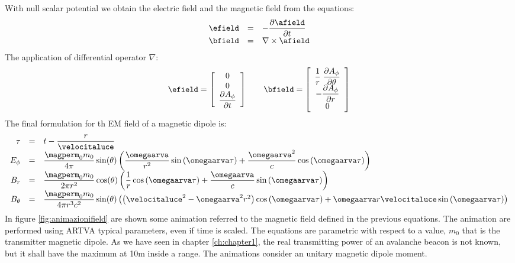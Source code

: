 With null scalar potential we obtain the electric field and the magnetic field from the equations:
\begin{equation}
\begin{array}{rcl}
\efield & = & - \partialtarg{\afield} \\
\bfield & = & \nabla\times\afield 
\end{array}
\end{equation}
The application of differential operator $\nabla$:
\begin{equation}
\efield = \left[ \begin{array}{c} 0 \\ 0 \\ \partialtarg{A_{\phi}} \end{array} \right]
\qquad
\bfield = \left[ \begin{array}{c} \dfrac{1}{r}\;\dfrac{\partial A_{\phi}}{\partial \theta} \\ - \dfrac{\partial A_{\phi}}{\partial r} \\ 0 \end{array} \right]
\end{equation}
The final formulation for th EM field of a magnetic dipole is\citep{knoepfel2008magnetic}:
\begin{equation}
\begin{array}{rcl}
\label{eq:campidef1}
\tau & = &  t - \dfrac{r}{\velocitaluce} \\
E_{\phi} & = & \dfrac{\magperm_0 m_0}{4\pi}\sin(\theta)\left( \dfrac{\omegaarva}{r^2}\sin\left( \omegaarva\tau \right) + \dfrac{\omegaarva^2}{c}\cos\left( \omegaarva\tau \right) \right) \\
B_{r} & = & \dfrac{\magperm_0 m_0}{2\pi r^2}\cos(\theta)\left( \dfrac{1}{r}\cos\left( \omegaarva\tau \right) + \dfrac{\omegaarva}{c}\sin\left( \omegaarva\tau \right) \right) \\
B_{\theta} & = & \dfrac{\magperm_0 m_0}{4 \pi r^3 c^2}\sin(\theta)\left( \left( \velocitaluce^2 - \omegaarva^2 r^2 \right)\cos\left( \omegaarva\tau \right) + \omegaarva r \velocitaluce \sin\left( \omegaarva\tau \right) \right) 
\end{array}
\end{equation}
In figure \ref{fig:animazionifield} are shown some animation referred to the magnetic field defined in the previous equations. The animation are performed using ARTVA typical parameters, even if time is scaled. The equations are parametric with respect to a value, $m_0$ that is the transmitter magnetic dipole. As we have seen in chapter \ref{ch:chapter1}, the real transmitting power of an avalanche beacon is not known, but it shall have the maximum at \num{10}\si{\meter} inside a range. The animations consider an unitary magnetic dipole moment.

